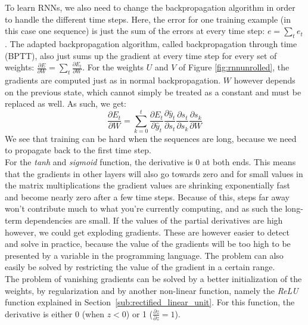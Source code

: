 To learn RNNs, we also need to change the backpropagation algorithm in order to handle the different time steps. Here, the error for one training example (in this case one sequence) is just the sum of the errors at every time step: $e = \sum_t e_t$. The adapted backpropagation algorithm, called backpropagation through time (BPTT), also just sums up the gradient at every time step for every set of weights:  $\frac{\partial E}{\partial W} = \sum_t \frac{\partial E_t}{\partial W}$. For the weights $U$ and $V$ of Figure \ref{fig:rnnunrolled}, the gradients are computed just as in normal backpropagation. $W$ however depends on the previous state, which cannot simply be treated as a constant and must be replaced as well. As such, we get:
\begin{equation}
\frac{\partial E_t}{\partial W} = \sum_{k=0}^t \frac{\partial E_t}{\partial \hat{y}_t} \frac{\partial \hat{y}_t}{\partial s_t} \frac{\partial s_t}{\partial s_k} \frac{\partial s_k}{\partial W}
\end{equation}
We see that training can be hard when the sequences are long, because we need to propagate back to the first time step.\\

For the \textit{tanh} and \textit{sigmoid} function, the derivative is $0$ at both ends. This means that the gradients in other layers will also go towards zero and for small values in the matrix multiplications the gradient values are shrinking exponentially fast and become nearly zero after a few time steps. Because of this, steps far away won't contribute much to what you're currently computing, and as such the long-term dependencies are small. If the values of the partial derivatives are high however, we could get exploding gradients. These are however easier to detect and solve in practice, because the value of the gradients will be too high to be presented by a variable in the programming language. The problem can also easily be solved by restricting the value of the gradient in a certain range.\\ %
The problem of vanishing gradients can be solved by a better initialization of the weights, by regularization and by another non-linear function, namely the \textit{ReLU} function explained in Section~\ref{sub:rectified_linear_unit}.
For this function, the derivative is either 0 (when $z<0$) or 1 ($\frac{\partial z}{\partial z} = 1$).\\

